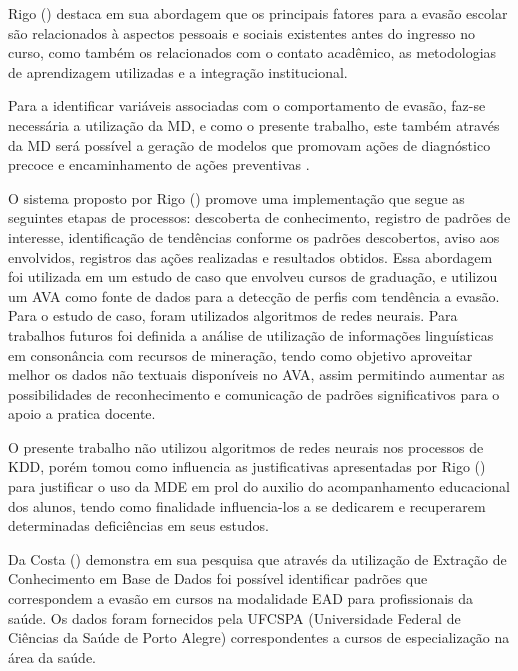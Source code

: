 Rigo (\citeyear{rigo2012minerando}) destaca em sua abordagem que os principais fatores para a evasão escolar são relacionados à aspectos pessoais e sociais existentes antes do ingresso no curso, como também os relacionados com o contato acadêmico, as metodologias de aprendizagem utilizadas e a integração institucional.

Para a identificar variáveis associadas com o comportamento de evasão, faz-se necessária a utilização da MD, e como o presente trabalho, este também através da MD será possível a geração de modelos que promovam ações de diagnóstico precoce e encaminhamento de ações preventivas \cite{rigo2012minerando}.

O sistema proposto por Rigo (\citeyear{rigo2012minerando}) promove uma implementação que segue as seguintes etapas de processos: descoberta de conhecimento, registro de padrões de interesse, identificação de tendências conforme os padrões descobertos, aviso aos envolvidos, registros das ações realizadas e resultados obtidos. Essa abordagem foi utilizada em um estudo de caso que envolveu cursos de graduação, e utilizou um AVA como fonte de dados para a detecção de perfis com tendência a evasão. Para o estudo de caso, foram utilizados algoritmos de redes neurais. Para trabalhos futuros foi definida a análise de utilização de informações linguísticas em consonância com recursos de mineração, tendo como objetivo aproveitar melhor os dados não textuais disponíveis no AVA, assim permitindo aumentar as possibilidades de reconhecimento e comunicação de padrões significativos para o apoio a pratica docente.

O presente trabalho não utilizou algoritmos de redes neurais nos processos de KDD, porém tomou como influencia as justificativas apresentadas por Rigo (\citeyear{rigo2012minerando}) para justificar o uso da MDE em prol do auxilio do acompanhamento educacional dos alunos, tendo como finalidade influencia-los a se dedicarem e recuperarem determinadas deficiências em seus estudos.

\label{ref:costa}

Da Costa (\citeyear{da2012minerando}) demonstra em sua pesquisa que através da utilização de Extração de Conhecimento em Base de Dados foi possível identificar padrões que correspondem a evasão em cursos na modalidade EAD para profissionais da saúde. Os dados foram fornecidos pela UFCSPA (Universidade Federal de Ciências da Saúde de Porto Alegre) correspondentes a cursos de especialização na área da saúde.

